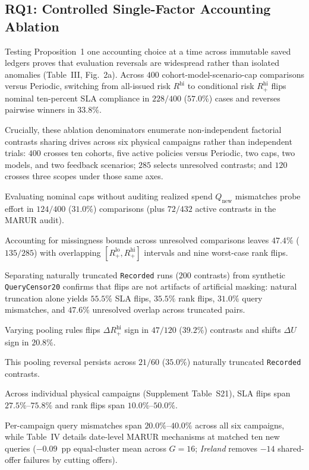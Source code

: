 \documentclass[journal,10pt]{IEEEtran}
\begin{document}
\subsection{RQ1: Controlled Single-Factor Accounting Ablation}
Testing Proposition~1 one accounting choice at a time across immutable saved ledgers proves that evaluation reversals are widespread rather than isolated anomalies (Table~III, Fig.~2a). Across $400$ cohort-model-scenario-cap comparisons versus Periodic, switching from all-issued risk $R^{\text{hi}}$ to conditional risk $R_+^{\text{hi}}$ flips nominal ten-percent SLA compliance in $228/400$ ($57.0\%$) cases and reverses pairwise winners in $33.8\%$.

Crucially, these ablation denominators enumerate non-independent factorial contrasts sharing drives across six physical campaigns rather than independent trials: $400$ crosses ten cohorts, five active policies versus Periodic, two caps, two models, and two feedback scenarios; $285$ selects unresolved contrasts; and $120$ crosses three scopes under those same axes.

Evaluating nominal caps without auditing realized spend $Q_{\text{new}}$ mismatches probe effort in $124/400$ ($31.0\%$) comparisons (plus $72/432$ active contrasts in the MARUR audit).

Accounting for missingness bounds across unresolved comparisons leaves $47.4\%$ ($135/285$) with overlapping $[R_+^{\text{lo}}, R_+^{\text{hi}}]$ intervals and nine worst-case rank flips.

Separating naturally truncated \texttt{Recorded} runs ($200$ contrasts) from synthetic \texttt{QueryCensor20} confirms that flips are not artifacts of artificial masking: natural truncation alone yields $55.5\%$ SLA flips, $35.5\%$ rank flips, $31.0\%$ query mismatches, and $47.6\%$ unresolved overlap across truncated pairs.

Varying pooling rules flips $\Delta R_+^{\text{hi}}$ sign in $47/120$ ($39.2\%$) contrasts and shifts $\Delta U$ sign in $20.8\%$.

This pooling reversal persists across $21/60$ ($35.0\%$) naturally truncated \texttt{Recorded} contrasts.

Across individual physical campaigns (Supplement Table~S21), SLA flips span $27.5\%$--$75.8\%$ and rank flips span $10.0\%$--$50.0\%$.

Per-campaign query mismatches span $20.0\%$--$40.0\%$ across all six campaigns, while Table~IV details date-level MARUR mechanisms at matched ten new queries ($-0.09$~pp equal-cluster mean across $G=16$; \emph{Ireland} removes $-14$ shared-offer failures by cutting offers).
\end{document}

